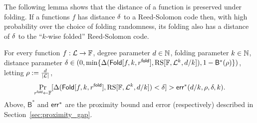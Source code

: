 The following lemma shows that the distance of a function is preserved under folding. If a functions $f$ has distance $\delta$ to a Reed-Solomon code then, with high probability over the choice of folding randomness, its folding also has a distance of $\delta$ to the ``$k$-wise folded'' Reed-Solomon code.

\begin{lemma}
    For every function $f:\mathcal{L}\rightarrow\mathbb{F}$, degree parameter $d\in\mathbb{N}$, folding parameter $k\in\mathbb{N}$, distance parameter $\delta\in(0,\min\{{\Delta(\mathsf{Fold}[f,k,r^{\mathsf{fold}}],\mathrm{RS}[\mathbb{F},{\mathcal{L}}^k, d/k]),1-{\mathsf{B}}^*(\rho)}\})$, letting $\rho:=\frac{d}{|\mathcal{L}|}$,
    \[
        \Pr_{r^{\mathsf{fold}}\gets\mathbb{F}}[\Delta(\mathsf{Fold}[f,k,r^{\mathsf{fold}}],\mathrm{RS}[\mathbb{F},{\mathcal{L}}^k, d/k])<\delta]>\mathsf{err}^*(d/k,\rho,\delta,k).
    \]
    Above, ${\mathsf{B}}^*$ and ${\mathsf{err}}^*$ are the proximity bound and error (respectively) described in Section~\ref{sec:proximity_gap}.
\end{lemma}